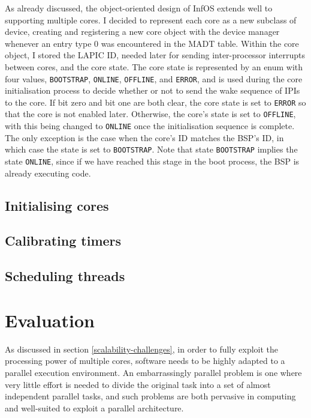 \documentclass[bsc,frontabs,twoside,singlespacing,parskip,deptreport]{infthesis}     %
\begin{document}
As already discussed, the object-oriented design of InfOS extends well to supporting multiple cores. I decided to represent each core as a new subclass of device, creating and registering a new core object with the device manager whenever an entry type 0 was encountered in the MADT table. Within the core object, I stored the LAPIC ID, needed later for sending inter-processor interrupts between cores, and the core state. The core state is represented by an enum with four values, \verb|BOOTSTRAP|, \verb|ONLINE|, \verb|OFFLINE|, and \verb|ERROR|, and is used during the core initialisation process to decide whether or not to send the wake sequence of IPIs to the core. If bit zero and bit one are both clear, the core state is set to \verb|ERROR| so that the core is not enabled later. Otherwise, the core's state is set to \verb|OFFLINE|, with this being changed to \verb|ONLINE| once the initialisation sequence is complete. The only exception is the case when the core's ID matches the BSP's ID, in which case the state is set to \verb|BOOTSTRAP|. Note that state \verb|BOOTSTRAP| implies the state \verb|ONLINE|, since if we have reached this stage in the boot process, the BSP is already executing code.

\section{Initialising cores} \label{initialising-cores}



\section{Calibrating timers} \label{calibrating-timers}
\section{Scheduling threads} \label{scheduling-threads}


\chapter{Evaluation}

As discussed in section \ref{scalability-challenges}, in order to fully exploit the processing power of multiple cores, software needs to be highly adapted to a parallel execution environment. An embarrassingly parallel problem is one where very little effort is needed to divide the original task into a set of almost independent parallel tasks, and such problems are both pervasive in computing and well-suited to exploit a parallel architecture. 
\end{document}
